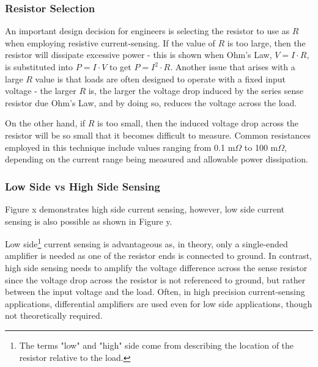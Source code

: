 \documentclass[main.tex]{subfiles}
\begin{document}

\subsubsection{Resistor Selection}
An important design decision for engineers is selecting the resistor to use as $R$ when employing resistive current-sensing. If the value of $R$ is too large, then the resistor will dissipate excessive power - this is shown when Ohm's Law, $V=I \cdot R$, is substituted into $P=I \cdot V$ to get $P=I^{2} \cdot R$. Another issue that arises with a large $R$ value is that loads are often designed to operate with a fixed input voltage - the larger $R$ is, the larger the voltage drop induced by the series sense resistor due Ohm's Law, and by doing so, reduces the voltage across the load. \newline

\newnoindentpara On the other hand, if $R$ is too small, then the induced voltage drop across the resistor will be so small that it becomes difficult to measure. Common resistances employed in this technique include values ranging from 0.1 m$\Omega$ to 100 m$\Omega$, depending on the current range being measured and allowable power dissipation.

\subsubsection{Low Side vs High Side Sensing}
Figure x demonstrates high side current sensing, however, low side current sensing is also possible as shown in Figure y.


\noindent Low side\footnote{The terms "low" and "high" side come from describing the location of the resistor relative to the load.} current sensing is advantageous as, in theory, only a single-ended amplifier is needed as one of the resistor ends is connected to ground. In contrast, high side sensing needs to amplify the voltage difference across the sense resistor since the voltage drop across the resistor is not referenced to ground, but rather between the input voltage and the load. Often, in high precision current-sensing applications, differential amplifiers are used even for low side applications, though not theoretically required. %
\end{document}

